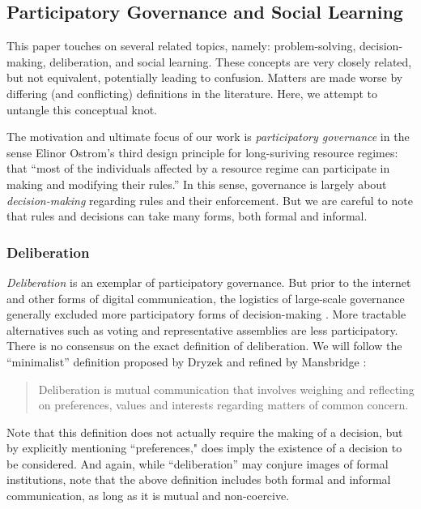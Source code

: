 \documentclass[manuscript,screen,review,acmsmall]{acmart}
\begin{document}
\subsection{Participatory Governance and Social Learning}
This paper touches on several related topics, namely: problem-solving, decision-making, deliberation, and social learning.
These concepts are very closely related, but not equivalent,
potentially leading to confusion.
Matters are made worse by differing (and conflicting) definitions in the literature.
Here, we attempt to untangle this conceptual knot.

The motivation and ultimate focus of our work is {\em participatory governance}
in the sense Elinor Ostrom's third design principle for long-suriving resource regimes: that ``most of the individuals affected by a resource
regime can participate in making and modifying their rules.''
\cite{ostrom_collective_2000}
In this sense, governance is largely about {\em decision-making} regarding
rules and their enforcement.
But we are careful to note that rules and decisions can take many forms,
both formal and informal.

\subsubsection{Deliberation}
{\em Deliberation} is an exemplar of participatory governance.
But prior to the internet and other forms of digital communication,
the logistics of large-scale governance generally excluded more participatory
forms of decision-making \cite{ackerman_deliberation_2002}.
More tractable alternatives such as voting and representative
assemblies are less participatory.
There is no consensus on the exact definition of deliberation.
We will follow the ``minimalist'' definition proposed by Dryzek
\cite{dryzek_deliberative_2002} and refined by Mansbridge \cite{mansbridge_minimalist_2015}:
\begin{quote}
Deliberation is mutual communication that involves weighing and reflecting on preferences, values and interests regarding matters of common concern.
\end{quote}
Note that this definition does not actually require the making of a decision, but by explicitly mentioning ``preferences," does imply the existence of a decision to be considered.
And again, while ``deliberation'' may conjure images of formal institutions,
note that the above definition includes both formal and informal communication,
as long as it is mutual and non-coercive.
\end{document}

